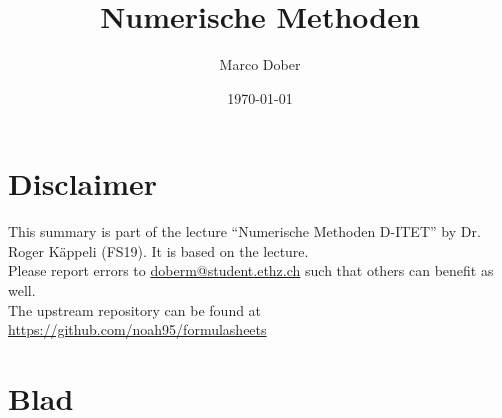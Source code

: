 \documentclass[a4paper, fontsize=8pt, landscape, DIV=1]{scrartcl}
\title{Numerische Methoden}
\author{Marco Dober}
\date{\today}
\begin{document}
	\setcounter{secnumdepth}{3} %
	\begin{multicols*}{4}
		\section*{Disclaimer}
		This summary is part of the lecture ``Numerische Methoden D-ITET'' by Dr. Roger Käppeli (FS19). It is based on the lecture. \\[6pt]
		Please report errors to \href{mailto:doberm@student.ethz.ch}{doberm@student.ethz.ch} such that others can benefit as well.\\[6pt]	
		The upstream repository can be found at \href{https://github.com/noah95/formulasheets}{https://github.com/noah95/formulasheets}  	
		\newpage

		\maketitle 
		\thispagestyle{fancy}
		
		\section{Blad}
 
		\end{multicols*}
	\setcounter{secnumdepth}{3}
\end{document}
